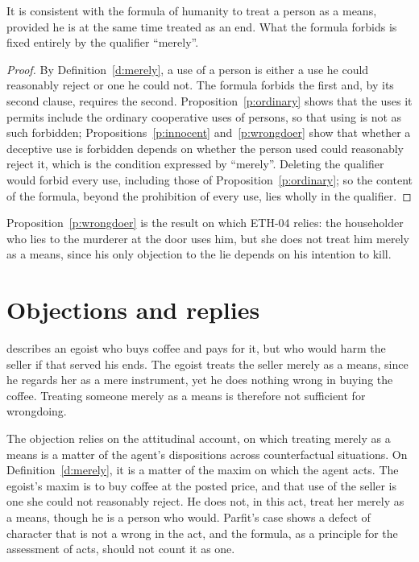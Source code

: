 \documentclass{situationist-preprint}
\begin{document}
\begin{theorem}\label{t:main}
It is consistent with the formula of humanity to treat a person as a means, provided he is at the same time treated as an end. What the formula forbids is fixed entirely by the qualifier \enquote{merely}.
\end{theorem}

\begin{proof}
By Definition~\ref{d:merely}, a use of a person is either a use he could reasonably reject or one he could not. The formula forbids the first and, by its second clause, requires the second. Proposition~\ref{p:ordinary} shows that the uses it permits include the ordinary cooperative uses of persons, so that using is not as such forbidden; Propositions~\ref{p:innocent} and~\ref{p:wrongdoer} show that whether a deceptive use is forbidden depends on whether the person used could reasonably reject it, which is the condition expressed by \enquote{merely}. Deleting the qualifier would forbid every use, including those of Proposition~\ref{p:ordinary}; so the content of the formula, beyond the prohibition of every use, lies wholly in the qualifier.
\end{proof}

Proposition~\ref{p:wrongdoer} is the result on which ETH-04 relies: the householder who lies to the murderer at the door uses him, but she does not treat him merely as a means, since his only objection to the lie depends on his intention to kill.

\section{Objections and replies}

\begin{objection}\label{o:parfit}
\citet{Parfit2011} describes an egoist who buys coffee and pays for it, but who would harm the seller if that served his ends. The egoist treats the seller merely as a means, since he regards her as a mere instrument, yet he does nothing wrong in buying the coffee. Treating someone merely as a means is therefore not sufficient for wrongdoing.
\end{objection}

\begin{reply}
The objection relies on the attitudinal account, on which treating merely as a means is a matter of the agent's dispositions across counterfactual situations. On Definition~\ref{d:merely}, it is a matter of the maxim on which the agent acts. The egoist's maxim is to buy coffee at the posted price, and that use of the seller is one she could not reasonably reject. He does not, in this act, treat her merely as a means, though he is a person who would. Parfit's case shows a defect of character that is not a wrong in the act, and the formula, as a principle for the assessment of acts, should not count it as one.
\end{reply}
\end{document}

